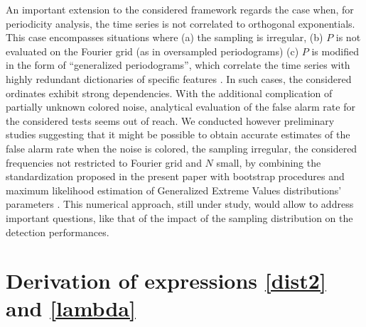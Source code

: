 \documentclass[journal]{IEEEtran}
\begin{document}
   
 
 An important extension to the considered framework regards the case  when, for periodicity analysis, the time series is not correlated to orthogonal exponentials. This case encompasses situations where (a) the sampling is  irregular, (b)   $P$ is not evaluated on the Fourier grid (as in oversampled periodograms) (c) $P$ is modified in the form of  ``generalized periodograms'', which correlate the time series with highly redundant dictionaries of specific features 
{\cite{Bolviken_1983a,Baluev_2008,Suveges_2012, Scargle_1982,Bretthorst_2003,Thong_2004,Zechmeister_2009,Baluev_2015,Gregory_2016}}. {   In such cases,   the considered ordinates exhibit strong dependencies.
With the additional complication of partially unknown colored noise, analytical evaluation of the false alarm rate  for the considered tests seems out of reach. 
We conducted however preliminary studies suggesting that it might be possible to obtain accurate estimates of the false alarm rate when the noise is colored,
the sampling irregular, the considered frequencies not restricted to Fourier grid and $N$ small, by
combining  the standardization proposed in the present paper  with bootstrap procedures \cite{Zoubir_1993} and maximum likelihood estimation of Generalized Extreme Values distributions' parameters \cite{Suveges_2012,Suveges_2015}.  This numerical approach, still under study, would allow to address important questions, like that of the impact of the sampling distribution on the detection performances.}

	

\appendices

 \section{Derivation of expressions \eqref{dist2} and \eqref{lambda}}
 \label{app1}
  
\end{document}
